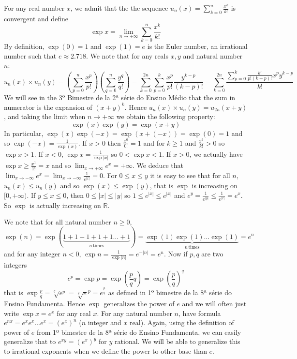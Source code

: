 For any real number $x$, we admit that the
the sequence $u_n(x) = \sum_{k=0}^{n} \frac{x^k}{k!}$ is convergent and define
%
$$\exp{x} = \lim_{n \rightarrow +\infty} \sum_{k=0}^{n} \frac{x^k}{k!}$$
%
By definition, $\exp{(0)} = 1$ and
$\exp{(1)} = e$ is the Euler number, an irrational
number such that $e \approx 2.718$.
We note that for any reals $x, y$ and natural number $n$:
%
$${u_n(x)} \times {u_n(y)} =
\left(\sum_{p = 0}^{n} \frac{x^p}{p!}\right)
\left(\sum_{q = 0}^{n} \frac{y^q}{q!}\right)
= \sum_{k=0}^{2n} \sum_{p=0}^{k} \frac{x^p}{p!} \frac{y^{k-p}}{{(k-p)}!}
=\sum_{k=0}^{2n} \frac{
\sum_{p=0}^{k} \frac{k!}{{p!}{{(k-p)}!}} x^p y^{k-p}}{k!}
$$
%
We will see in the 3º Bimestre de la 2ª série do Ensino Médio that
the sum in numerator is the expansion of ${(x+y)}^k$.
Hence ${u_n(x)} \times {u_n(y)} = u_{2n}(x+y)$, and taking the limit
when $n \rightarrow +\infty$ we obtain the following property:
%
$$\exp{(x)} \exp{(y)} = \exp{(x+y)}$$
%
In particular, $\exp{(x)} \exp{(-x)} = \exp{(x + {(-x)})} = \exp{(0)} = 1$
and so $\exp{(-x)} = \frac{1}{\exp{(x)}}$.
If $x > 0$ then $\frac{x^0}{0!} = 1$ and for $k \geq 1$ and $\frac{x^k}{k!} > 0$
so $\exp{x} > 1$. If $x < 0$, $\exp{x} = \frac{1}{\exp{|x|}}$ so
$0 < \exp{x} < 1$. If $x > 0$, we actually have
$\exp{x} \geq \frac{x^1}{1!} = x$ and so
$\lim_{x \rightarrow +\infty} e^x = +\infty$.
We deduce that $\lim_{x \rightarrow -\infty} e^x =
\lim_{x \rightarrow -\infty} \frac{1}{e^{|x|}} = 0$.
For $0 \leq x \leq y$ it is easy to see that for all $n$,
$u_n{(x)} \leq u_n{(y)}$ and so $\exp{(x)} \leq \exp{(y)}$, that is $\exp$ is
increasing on $[0, +\infty)$. If $y \leq x \leq 0$, then
$0 \leq {|x|} \leq {|y|}$ so $1 \leq e^{|x|} \leq e^{|x|}$ and
$e^y = \frac{1}{e^{|y|}} \leq \frac{1}{e^{|x|}} = e^x$. So $\exp$ is actually
increasing on $\mathbb R$.

We note that for all natural number $n\geq0$,
%
$$\exp{(n)} = \exp{(
  \underset{n\,\text{times}}{\underbrace{1+1+1+1+1\dots+1}})} =
\underset{n\,\text{times}}{\underbrace{\exp{(1)}\exp{(1)}\dots\exp{(1)}}} = e^n
$$
%
and for any integer $n < 0$, $\exp{n} = \frac{1}{\exp{|n|}} = e^{-|n|} = e^n$.
Now if $p,q$ are two integers
%
$$e^p = \exp{p} = \exp\left(\frac{p}{q} q\right) =
\exp\left(\frac{p}{q}\right)^q$$
%
that is $\exp{\frac{p}{q}} = \sqrt[q]{e^p} = {\sqrt[q]{e}}^p = e^{\frac{p}{q}}$
as defined in 1º bimestre de la 8ª série do Ensino Fundamenta.
Hence $\exp$ generalizes the power of $e$
and we will often just write $\exp{x} = e^x$ for any real $x$.
For any natural number $n$, have formula $e^{n x} =
e^x e^x \dots e^x = {(e^{x})}^n$
($n$ integer and $x$ real). Again, using the definition of power of $e$ from
1º bimestre de la 8ª série do Ensino Fundamenta, we can easily generalize that
to $e^{x y} = {(e^{x})}^y$ for $y$ rational. We will be able to generalize this
to irrational exponents when we define the power to other base than $e$.

